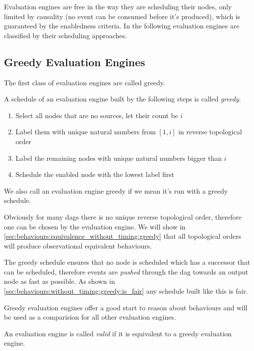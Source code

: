 Evaluation engines are free in the way they are scheduling their nodes, only limited by causality (no event can be consumed before it's produced), which is guaranteed by the enabledness criteria.
In the following evaluation engines are classified by their scheduling approaches.

\subsection{Greedy Evaluation Engines}
\label{sec:behaviours:without_timing:greedy}

The first class of evaluation engines are called greedy.

\begin{definition}[name = Greedy schedule]\label{def:greedy_schedule}
  A schedule of an evaluation engine built by the following steps is called \emph{greedy}.
  \begin{enumerate}
    \item Select all nodes that are no sources, let their count be \(i\)
    \item Label them with unique natural numbers from \([1,i]\) in reverse topological order
    \item Label the remaining nodes with unique natural numbers bigger than \(i\)
    \item Schedule the enabled node with the lowest label first
  \end{enumerate}

  We also call an evaluation engine greedy if we mean it's run with a greedy schedule.
\end{definition}

Obviously for many \glspl{dag} there is no unique reverse topological order, therefore one can be chosen by the evaluation engine.
We will show in \cref{sec:behaviours:equivalence_without_timing:greedy} that all topological orders will produce observational equivalent behaviours.

The greedy schedule ensures that no node is scheduled which has a successor that can be scheduled, therefore events are \emph{pushed} through the \gls{dag} towards an output node as fast as possible.
As shown in \cref{sec:behaviours:without_timing:greedy:is_fair} any schedule built like this is fair.

Greedy evaluation engines offer a good start to reason about behaviours and will be used as a comparision for all other evaluation engines.

\begin{definition}[name = Valid Evaluation Engines]\label{def:valid_eval_engine}
  An evaluation engine is called \emph{valid} if it is equivalent to a greedy evaluation engine.
\end{definition}


